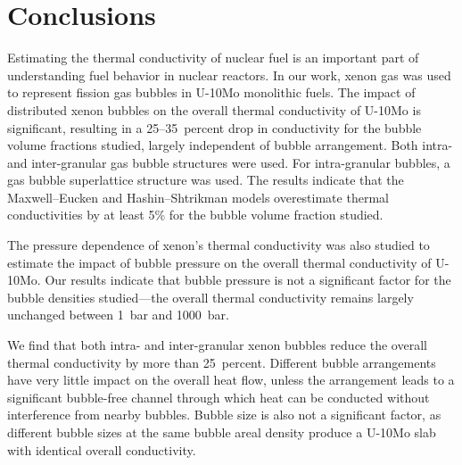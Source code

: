 \section{\label{sec:conclusion}Conclusions}
Estimating the thermal conductivity of nuclear fuel is an important part of understanding fuel behavior in nuclear reactors. In our work, xenon gas was used to represent fission gas bubbles in U-10Mo monolithic fuels. The impact of distributed xenon bubbles on the overall thermal conductivity of U-10Mo is significant, resulting in a 25--35~percent drop in conductivity for the bubble volume fractions studied, largely independent of bubble arrangement. Both intra- and inter-granular gas bubble structures were used. For intra-granular bubbles, a gas bubble superlattice structure was used. The results indicate that the Maxwell--Eucken and Hashin--Shtrikman models overestimate thermal conductivities by at least 5\% for the bubble volume fraction studied.

The pressure dependence of xenon's thermal conductivity was also studied to estimate the impact of bubble pressure on the overall thermal conductivity of U-10Mo. Our results indicate that bubble pressure is not a significant factor for the bubble densities studied---the overall thermal conductivity remains largely unchanged between 1~bar and 1000~bar.

We find that both intra- and inter-granular xenon bubbles reduce the overall thermal conductivity by more than 25~percent. Different bubble arrangements have very little impact on the overall heat flow, unless the arrangement leads to a significant bubble-free channel through which heat can be conducted without interference from nearby bubbles. Bubble size is also not a significant factor, as different bubble sizes at the same bubble areal density produce a U-10Mo slab with identical overall conductivity.


%


